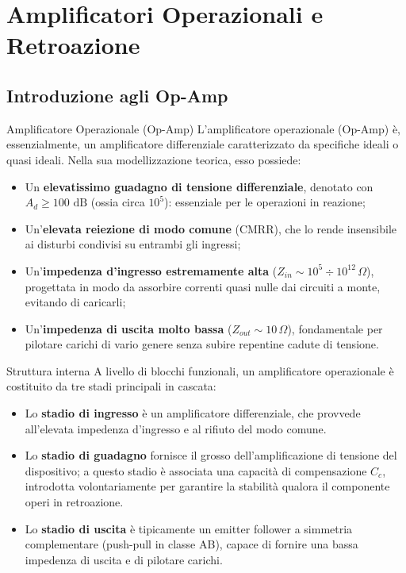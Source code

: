 \chapter{Amplificatori Operazionali e Retroazione}
\label{ch:opamp}

\section{Introduzione agli Op-Amp}

\begin{definizione}{Amplificatore Operazionale (Op-Amp)}
L'amplificatore operazionale (Op-Amp) è, essenzialmente, un amplificatore differenziale caratterizzato da specifiche ideali o quasi ideali. Nella sua modellizzazione teorica, esso possiede:
\begin{itemize}
    \item Un \textbf{elevatissimo guadagno di tensione differenziale}, denotato con $A_d \geq 100 \text{ dB}$ (ossia circa $10^5$): essenziale per le operazioni in reazione;
    \item Un'\textbf{elevata reiezione di modo comune} (CMRR), che lo rende insensibile ai disturbi condivisi su entrambi gli ingressi;
    \item Un'\textbf{impedenza d'ingresso estremamente alta} ($Z_{in} \sim 10^5 \div 10^{12}\,\Omega$), progettata in modo da assorbire correnti quasi nulle dai circuiti a monte, evitando di caricarli;
    \item Un'\textbf{impedenza di uscita molto bassa} ($Z_{out} \sim 10\,\Omega$), fondamentale per pilotare carichi di vario genere senza subire repentine cadute di tensione.
\end{itemize}
\end{definizione}

\begin{osservazione}{Struttura interna}
A livello di blocchi funzionali, un amplificatore operazionale è costituito da tre stadi principali in cascata:
\begin{itemize}
    \item Lo \textbf{stadio di ingresso} è un amplificatore differenziale, che provvede all'elevata impedenza d'ingresso e al rifiuto del modo comune.
    \item Lo \textbf{stadio di guadagno} fornisce il grosso dell'amplificazione di tensione del dispositivo; a questo stadio è associata una capacità di compensazione $C_c$, introdotta volontariamente per garantire la stabilità qualora il componente operi in retroazione.
    \item Lo \textbf{stadio di uscita} è tipicamente un emitter follower a simmetria complementare (push-pull in classe AB), capace di fornire una bassa impedenza di uscita e di pilotare carichi.
\end{itemize}
\end{osservazione}

